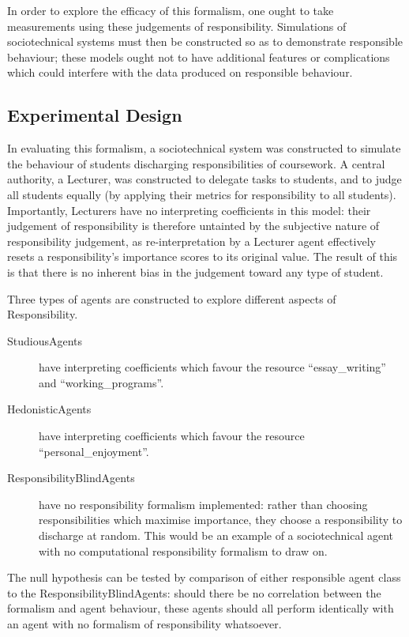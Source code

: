 In order to explore the efficacy of this formalism, one ought to take measurements using these judgements of responsibility. Simulations of sociotechnical systems must then be constructed so as to demonstrate responsible behaviour; these models ought not to have additional features or complications which could interfere with the data produced on responsible behaviour.\par

\subsection{Experimental Design}
In evaluating this formalism, a sociotechnical system was constructed to simulate the behaviour of students discharging responsibilities of coursework. A central authority, a Lecturer, was constructed to delegate tasks to students, and to judge all students equally (by applying their metrics for responsibility to all students). Importantly, Lecturers have no interpreting coefficients in this model: their judgement of responsibility is therefore untainted by the subjective nature of responsibility judgement, as re-interpretation by a Lecturer agent effectively resets a responsibility's importance scores to its original value. The result of this is that there is no inherent bias in the judgement toward any type of student.\par

Three types of agents are constructed to explore different aspects of Responsibility. 

\begin{description}
    \item [StudiousAgents ] have interpreting coefficients which favour the resource ``essay\_writing'' and ``working\_programs''.
    \item [HedonisticAgents ] have interpreting coefficients which favour the resource ``personal\_enjoyment''.
    \item [ResponsibilityBlindAgents ] have no responsibility formalism implemented: rather than choosing responsibilities which maximise importance, they choose a responsibility to discharge at random. This would be an example of a sociotechnical agent with no computational responsibility formalism to draw on.
\end{description}

The null hypothesis can be tested by comparison of either responsible agent class to the ResponsibilityBlindAgents: should there be no correlation between the formalism and agent behaviour, these agents should all perform identically with an agent with no formalism of responsibility whatsoever.\par

